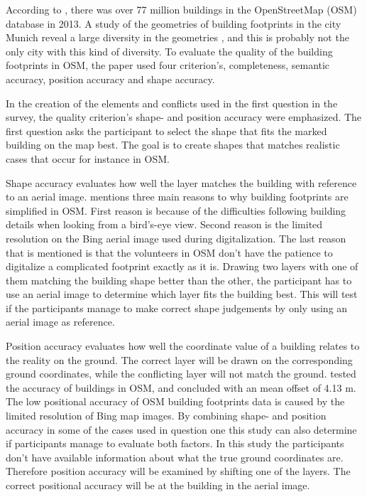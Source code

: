 According to \cite{Fan2014}, there was over 77 million buildings in the OpenStreetMap (OSM) database in 2013. A study of the geometries of building footprints in the city Munich reveal a large diversity in the geometries \citep{Fan2014}, and this is probably not the only city with this kind of diversity. To evaluate the quality of the building footprints in OSM, the \cite{Fan2014} paper used four criterion's, completeness, semantic accuracy, position accuracy and shape accuracy. 



In the creation of the elements and conflicts used in the first question in the survey, the quality criterion's shape- and position accuracy were emphasized. The first question asks the participant to select the shape that fits the marked building on the map best. The goal is to create shapes that matches realistic cases that occur for instance in OSM. 

Shape accuracy evaluates how well the layer matches the building with reference to an aerial image. \cite{Fan2014} mentions three main reasons to why building footprints are simplified in OSM. First reason is because of the difficulties following building details when looking from a bird's-eye view. Second reason is the limited resolution on the Bing aerial image used during digitalization. The last reason that is mentioned is that the volunteers in OSM don't have the patience to digitalize a complicated footprint exactly as it is. Drawing two layers with one of them matching the building shape better than the other, the participant has to use an aerial image to determine which layer fits the building best. This will test if the participants manage to make correct shape judgements by only using an aerial image as reference. 

Position accuracy evaluates how well the coordinate value of a building relates to the reality on the ground. The correct layer will be drawn on the corresponding ground coordinates, while the conflicting layer will not match the ground. \cite{Fan2014} tested the accuracy of buildings in OSM, and concluded with an mean offset of 4.13 m. The low positional accuracy of OSM building footprints data is caused by the limited resolution of Bing map images. By combining shape- and position accuracy in some of the cases used in question one this study can also determine if participants manage to evaluate both factors. In this study the participants don't have available information about what the true ground coordinates are. Therefore position accuracy will be examined by shifting one of the layers. The correct positional accuracy will be at the building in the aerial image. 

